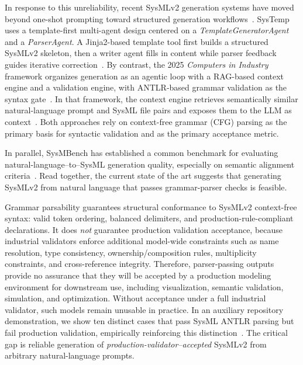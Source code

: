 \documentclass[colorlinks,upint,subscriptcorrection,varvw,hyphenate,balance]{asmeconf} %
\begin{document}
In response to this unreliability, recent SysMLv2 generation systems have moved beyond one-shot prompting toward structured generation workflows~\cite{bouamra2025systemp,cibrian2025sysmlagent}. SysTemp uses a template-first multi-agent design centered on a \textit{TemplateGeneratorAgent} and a \textit{ParserAgent}. A Jinja2-based template tool first builds a structured SysMLv2 skeleton, then a writer agent fills in content while parser feedback guides iterative correction~\cite{bouamra2025systemp}. By contrast, the 2025 \emph{Computers in Industry} framework organizes generation as an agentic loop with a RAG-based context engine and a validation engine, with ANTLR-based grammar validation as the syntax gate~\cite{cibrian2025sysmlagent}. In that framework, the context engine retrieves semantically similar natural-language prompt and SysML file pairs and exposes them to the LLM as context~\cite{cibrian2025sysmlagent}. Both approaches rely on context-free grammar (CFG) parsing as the primary basis for syntactic validation and as the primary acceptance metric.

In parallel, SysMBench has established a common benchmark for evaluating natural-language--to--SysML generation quality, especially on semantic alignment criteria~\cite{jin2025sysmbench}. Read together, the current state of the art suggests that generating SysMLv2 from natural language that passes grammar-parser checks is feasible.

Grammar parsability guarantees structural conformance to SysMLv2 context-free syntax: valid token ordering, balanced delimiters, and production-rule-compliant declarations. It does \emph{not} guarantee production validation acceptance, because industrial validators enforce additional model-wide constraints such as name resolution, type consistency, ownership/composition rules, multiplicity constraints, and cross-reference integrity. Therefore, parser-passing outputs provide no assurance that they will be accepted by a production modeling environment for downstream use, including visualization, semantic validation, simulation, and optimization. Without acceptance under a full industrial validator, such models remain unusable in practice. In an auxiliary repository demonstration, we show ten distinct cases that pass SysML ANTLR parsing but fail production validation, empirically reinforcing this distinction~\cite{antlrVsSysideDemo2026}. The critical gap is reliable generation of \emph{production-validator--accepted} SysMLv2 from arbitrary natural-language prompts.
\end{document}
